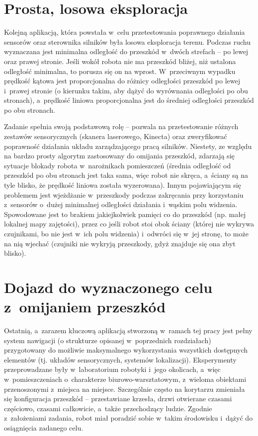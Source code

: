 \section{Prosta, losowa eksploracja}

Kolejną aplikacją, która powstała w~celu przetestowania poprawnego działania
sensorów oraz sterownika silników była losowa eksploracja terenu. Podczas
ruchu wyznaczana jest minimalna odległość do przeszkód w~dwóch strefach
-- po lewej oraz prawej stronie. Jeśli wokół robota nie ma przeszkód bliżej,
niż ustalona odległość minimalna, to porusza się on na wprost. W~przeciwnym
wypadku prędkość kątowa jest proporcjonalna do różnicy odległości przeszkód
po lewej i~prawej stronie (o kierunku takim, aby dążyć do wyrównania odległości
po obu stronach), a~prędkość liniowa proporcjonalna jest do średniej odległości
przeszkód po obu stronach.

Zadanie spełnia swoją podstawową rolę -- pozwala na przetestowanie różnych
zestawów sensorycznych (skanera laserowego, Kinecta) oraz zweryfikować
poprawność działania układu zarządzającego pracą silników. Niestety, ze względu
na bardzo prosty algorytm zastosowany do omijania przeszkód, zdarzają się sytuacje
blokady robota w~narożnikach pomieszczeń (średnia odległość od przeszkód po
obu stronach jest taka sama, więc robot nie skręca, a~ściany są na tyle blisko,
że prędkość liniowa została wyzerowana). Innym pojawiającym się problemem
jest wjeżdżanie w~przeszkody podczas zakręcania przy korzystaniu z~sensorów
o~dużej minimalnej odległości działania i~wąskim polu widzenia. Spowodowane jest
to brakiem jakiejkolwiek pamięci co do przeszkód (np. małej lokalnej mapy zajętości),
przez co jeśli robot stoi obok ściany (której nie wykrywa czujnikami, bo nie jest
w~ich polu widzenia) i~odwróci się w~jej stronę, to może na nią wjechać (czujniki
nie wykryją przeszkody, gdyż znajduje się ona zbyt blisko).






\section{Dojazd do wyznaczonego celu z~omijaniem przeszkód}

Ostatnią, a~zarazem kluczową aplikacją stworzoną w~ramach tej pracy jest
pełny system nawigacji (o strukturze opisanej w~poprzednich rozdziałach)
przygotowany do możliwie maksymalnego wykorzystania wszystkich dostępnych
elementów (tj. układów sensorycznych, systemów lokalizacji). Eksperymenty
przeprowadzane były w~laboratorium robotyki i~jego okolicach, a~więc w~pomieszczeniach
o~charakterze biurowo-warsztatowym, z~wieloma obiektami przenoszonymi z~miejsca
na miejsce. Szczególnie często na korytarzu zmieniała się konfiguracja przeszkód
-- przestawiane krzesła, drzwi otwierane czasami częściowo, czasami całkowicie,
a~także przechodzący ludzie. Zgodnie z~założeniami zadania, robot miał poradzić
sobie w~takim środowisku i~dążyć do osiągnięcia zadanego celu.

